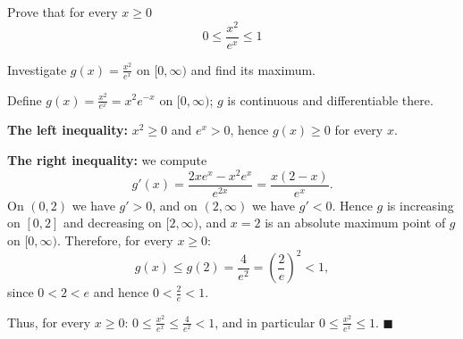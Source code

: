
\begin{question}
Prove that for every $x \ge 0$
\[ 0 \le \frac{x^2}{e^x} \le 1 \]
\end{question}

\begin{hint}
Investigate $g(x) = \frac{x^2}{e^x}$ on $[0, \infty)$ and find its maximum.
\end{hint}

\begin{solution}
Define $g(x) = \frac{x^2}{e^x} = x^2 e^{-x}$ on $[0, \infty)$; $g$ is continuous and differentiable there.

\textbf{The left inequality:} $x^2 \ge 0$ and $e^x > 0$, hence $g(x) \ge 0$ for every $x$.

\textbf{The right inequality:} we compute
\[ g'(x) = \frac{2x e^x - x^2 e^x}{e^{2x}} = \frac{x(2 - x)}{e^x}. \]
On $(0, 2)$ we have $g' > 0$, and on $(2, \infty)$ we have $g' < 0$. Hence $g$ is increasing on $[0, 2]$ and decreasing on $[2, \infty)$, and $x = 2$ is an absolute maximum point of $g$ on $[0, \infty)$. Therefore, for every $x \ge 0$:
\[ g(x) \le g(2) = \frac{4}{e^2} = \left( \frac{2}{e} \right)^2 < 1, \]
since $0 < 2 < e$ and hence $0 < \frac{2}{e} < 1$.

Thus, for every $x \ge 0$: $0 \le \frac{x^2}{e^x} \le \frac{4}{e^2} < 1$, and in particular $0 \le \frac{x^2}{e^x} \le 1$. $\blacksquare$
\end{solution}
